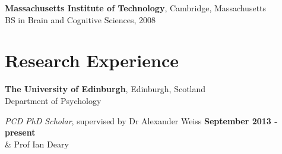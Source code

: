 \documentclass[margin,line]{res}
\newenvironment{list1}{
  \begin{list}{\ding{113}}{%
      \setlength{\itemsep}{0in}
      \setlength{\parsep}{0in} \setlength{\parskip}{0in}
      \setlength{\topsep}{0in} \setlength{\partopsep}{0in} 
      \setlength{\leftmargin}{0.17in}}}{\end{list}}
\begin{document}
\begin{resume}
{\bf Massachusetts Institute of Technology}, Cambridge, Massachusetts\\
BS in Brain and Cognitive Sciences, 2008



\vspace{0.1cm}


\section{\sc Research Experience}

{\bf The University of Edinburgh}, Edinburgh, Scotland \\
Department of Psychology

\vspace{-.2cm}
{\em PCD PhD Scholar}, supervised by Dr Alexander Weiss \hfill {\bf September 2013 - present}\\
\-\hspace{4.75cm} \& Prof Ian Deary
\vspace{-.1cm}



\end{resume}
\end{document}
